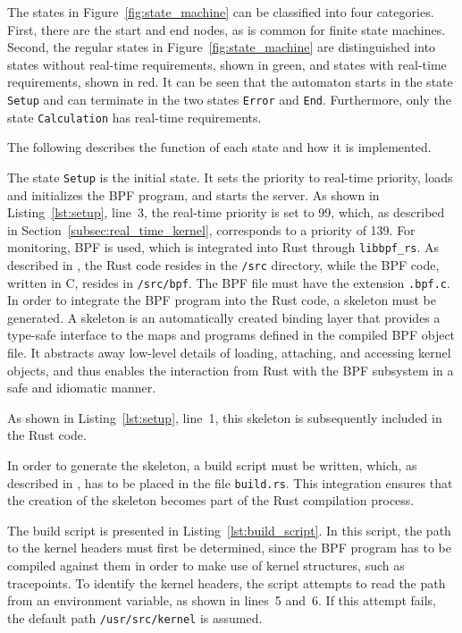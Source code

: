 The states in Figure~\ref{fig:state_machine} can be classified into four categories.  
First, there are the start and end nodes, as is common for finite state machines.  
Second, the regular states in Figure~\ref{fig:state_machine} are distinguished into states without real-time requirements, shown in green, and states with real-time requirements, shown in red.  
It can be seen that the automaton starts in the state \texttt{Setup} and can terminate in the two states \texttt{Error} and \texttt{End}.  
Furthermore, only the state \texttt{Calculation} has real-time requirements.  

The following describes the function of each state and how it is implemented.  

The state \texttt{Setup} is the initial state.  
It sets the priority to real-time priority, loads and initializes the \ac{BPF} program, and starts the server.  
As shown in Listing~\ref{lst:setup}, line~3, the real-time priority is set to 99, which, as described in Section~\ref{subsec:real_time_kernel}, corresponds to a priority of 139.  
For monitoring, \ac{BPF} is used, which is integrated into Rust through \texttt{libbpf\_rs}.  
As described in \cite{libbpf-rs}, the Rust code resides in the \texttt{/src} directory, while the \ac{BPF} code, written in C, resides in \texttt{/src/bpf}.  
The \ac{BPF} file must have the extension \texttt{.bpf.c}.
In order to integrate the \ac{BPF} program into the Rust code, a skeleton must be generated.  
A skeleton is an automatically created binding layer that provides a type-safe interface to the maps and programs defined in the compiled \ac{BPF} object file.  
It abstracts away low-level details of loading, attaching, and accessing kernel objects, and thus enables the interaction from Rust with the \ac{BPF} subsystem in a safe and idiomatic manner.  

As shown in Listing~\ref{lst:setup}, line~1, this skeleton is subsequently included in the Rust code.  

In order to generate the skeleton, a build script must be written, which, as described in \cite{build_script}, has to be placed in the file \texttt{build.rs}.  
This integration ensures that the creation of the skeleton becomes part of the Rust compilation process.  

The build script is presented in Listing~\ref{lst:build_script}.  
In this script, the path to the kernel headers must first be determined, since the \ac{BPF} program has to be compiled against them in order to make use of kernel structures, such as tracepoints.  
To identify the kernel headers, the script attempts to read the path from an environment variable, as shown in lines~5 and~6.  
If this attempt fails, the default path \texttt{/usr/src/kernel} is assumed.  


